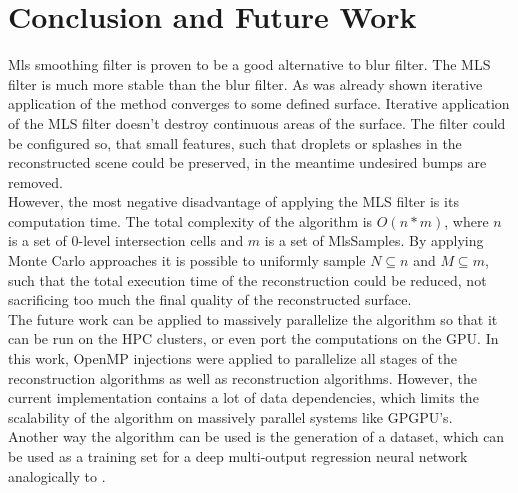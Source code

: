         


\section{Conclusion and Future Work}
Mls smoothing filter is proven to be a good alternative to blur filter. The MLS filter is much more stable than the blur filter. As was already shown iterative application of the method converges to some defined surface. Iterative application of the MLS filter doesn't destroy continuous areas of the surface. The filter could be configured so, that small features, such that droplets or splashes in the reconstructed scene could be preserved, in the meantime undesired bumps are removed.\\
However, the most negative disadvantage of applying the MLS filter is its computation time. The total complexity of the algorithm is $O(n*m)$, where $n$ is a set of 0-level intersection cells and $m$ is a set of MlsSamples. By applying Monte Carlo approaches it is possible to uniformly sample $N \subseteq n$ and $M \subseteq m$, such that the total execution time of the reconstruction could be reduced, not sacrificing too much the final quality of the reconstructed surface.\\
The future work can be applied to massively parallelize the algorithm so that it can be run on the HPC clusters, or even port the computations on the GPU. In this work, OpenMP injections were applied to parallelize all stages of the reconstruction algorithms as well as reconstruction algorithms. However, the current implementation contains a lot of data dependencies, which limits the scalability of the algorithm on massively parallel systems like GPGPU's.\\ Another way the algorithm can be used is the generation of a dataset, which can be used as a training set for a deep multi-output regression neural network analogically to \cite{DNNNoiseFilter}.
